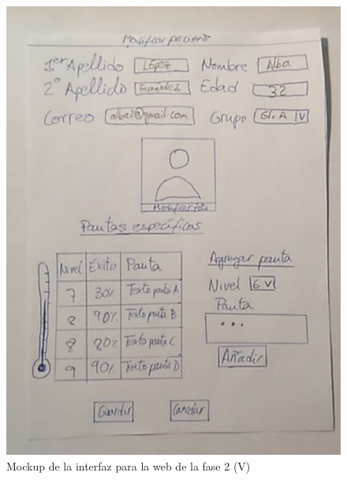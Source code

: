 \begin{figure}[!htbp]
    \centering
    \includegraphics[scale=0.3]{Imagenes/anxA6.jpg}
    \caption[Mockup de la interfaz para la web de la fase 1 (V)]{Mockup de la interfaz para la web de la fase 2 (V)}
    \label{fig:mockup6}
\end{figure}


